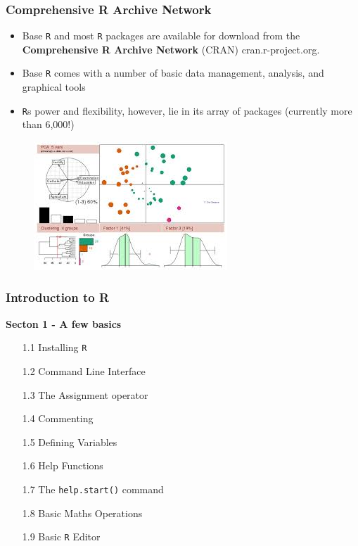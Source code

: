 \documentclass{beamer}
\begin{document}
 	\begin{frame}
 		\frametitle{Comprehensive R Archive Network}
 		\begin{itemize}
 			\item Base \texttt{R} and most \texttt{R} packages are available for download from the \textbf{Comprehensive R Archive Network}
 			(CRAN) cran.r-project.org. 
 			\item Base \texttt{R} comes with a number of basic data management,
 			analysis, and graphical tools 
 			\item \texttt{R}s power and flexibility, however, lie in its array of packages
 			(currently more than 6,000!)
 		\end{itemize}
 		
 	\end{frame}
  	\begin{frame}
 		\begin{figure}
\centering
\includegraphics[width=1.2\linewidth]{CRAN}
\end{figure}
 	\end{frame}
 	\begin{frame}
 		\frametitle{Introduction to R}
\textbf{Secton 1 - A few basics} 
		\begin{itemize}
 			\item[1.1] Installing \texttt{R}      
 			\item[1.2] Command Line Interface     
 			\item[1.3] The Assignment operator     
 			\item[1.4] Commenting      
 			\item[1.5] Defining Variables     
 			\item[1.6] Help Functions      
 			\item[1.7] The \texttt{help.start()} command     
 			\item[1.8] Basic Maths Operations     
 			\item[1.9] Basic \texttt{R} Editor      
 		\end{itemize}
 	\end{frame}
\end{document}
